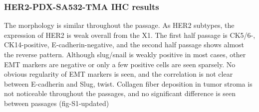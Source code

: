 \documentclass{article}
\begin{document}
\subsubsection{HER2-PDX-SA532-TMA IHC results}
The morphology is similar throughout the passage. As HER2 subtypes, the expression of HER2 is weak overall from the X1. The first half passage is CK5/6-, CK14-positive, E-cadherin-negative, and the second half passage shows almost the reverse pattern.
Although slug/snail is weakly positive in most cases, other EMT markers are negative or only a few positive cells are seen sparsely. No obvious regularity of EMT markers is seen, and the correlation is not clear between E-cadherin and Slug, twist.
Collagen fiber deposition in tumor stroma is not noticeable throughout the passages, and no significant difference is seen between passages (fig-S1-updated)
\end{document}
